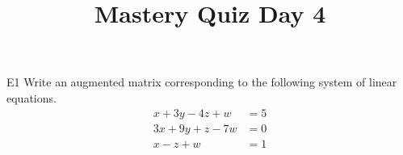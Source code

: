 \documentclass{sbgLAquiz}
\title{Mastery Quiz Day 4 }
\begin{document}
\begin{problem}{E1}
Write an augmented matrix corresponding to the following system of linear equations.
\begin{align*}
x+3y-4z +w &= 5 \\
3x+9y+z-7w &= 0 \\
x-z +w &= 1
\end{align*}
\end{problem}
\end{document}
